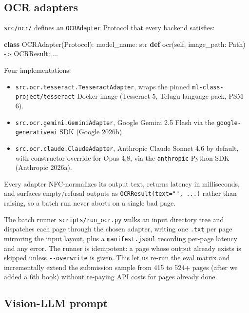 \documentclass[
  letterpaper,
  DIV=11,
  numbers=noendperiod]{scrartcl}
\newenvironment{Shaded}{\begin{snugshade}}{\end{snugshade}}
\newcommand{\BuiltInTok}[1]{\textcolor[rgb]{0.00,0.23,0.31}{#1}}
\newcommand{\KeywordTok}[1]{\textcolor[rgb]{0.00,0.23,0.31}{\textbf{#1}}}
\newcommand{\NormalTok}[1]{\textcolor[rgb]{0.00,0.23,0.31}{#1}}
\newcommand{\OperatorTok}[1]{\textcolor[rgb]{0.37,0.37,0.37}{#1}}
\newcommand{\VariableTok}[1]{\textcolor[rgb]{0.07,0.07,0.07}{#1}}
\providecommand{\tightlist}{%
  \setlength{\itemsep}{0pt}\setlength{\parskip}{0pt}}
\begin{document}
\subsection{OCR adapters}\label{ocr-adapters}

\texttt{src/ocr/} defines an \texttt{OCRAdapter} Protocol that every
backend satisfies:

\begin{Shaded}
\begin{Highlighting}[]
\KeywordTok{class}\NormalTok{ OCRAdapter(Protocol):}
\NormalTok{    model\_name: }\BuiltInTok{str}
    \KeywordTok{def}\NormalTok{ ocr(}\VariableTok{self}\NormalTok{, image\_path: Path) }\OperatorTok{{-}\textgreater{}}\NormalTok{ OCRResult: ...}
\end{Highlighting}
\end{Shaded}

Four implementations:

\begin{itemize}
\tightlist
\item
  \texttt{src.ocr.tesseract.TesseractAdapter}, wraps the pinned
  \texttt{ml-class-project/tesseract} Docker image (Tesseract 5, Telugu
  language pack, PSM 6).
\item
  \texttt{src.ocr.gemini.GeminiAdapter}, Google Gemini 2.5 Flash via the
  \texttt{google-generativeai} SDK (Google 2026b).
\item
  \texttt{src.ocr.claude.ClaudeAdapter}, Anthropic Claude Sonnet 4.6 by
  default, with constructor override for Opus 4.8, via the
  \texttt{anthropic} Python SDK (Anthropic 2026a).
\end{itemize}

Every adapter NFC-normalizes its output text, returns latency in
milliseconds, and surfaces empty/refusal outputs as
\texttt{OCRResult(text="",\ ...)} rather than raising, so a batch run
never aborts on a single bad page.

The batch runner \texttt{scripts/run\_ocr.py} walks an input directory
tree and dispatches each page through the chosen adapter, writing one
\texttt{.txt} per page mirroring the input layout, plus a
\texttt{manifest.jsonl} recording per-page latency and any error. The
runner is idempotent: a page whose output already exists is skipped
unless \texttt{-\/-overwrite} is given. This let us re-run the eval
matrix and incrementally extend the submission sample from 415 to 524+
pages (after we added a 6th book) without re-paying API costs for pages
already done.

\subsection{Vision-LLM prompt}\label{vision-llm-prompt}
\end{document}
